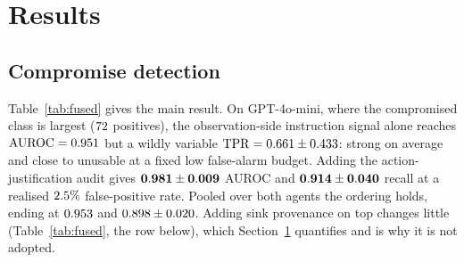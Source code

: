 \documentclass[preprint,12pt,number]{elsarticle}
\theoremstyle{definition}
\begin{document}
\section{Results}\label{sec:results}

\subsection{Compromise detection}

Table~\ref{tab:fused} gives the main result. On GPT-4o-mini, where the
compromised class is largest ($72$ positives), the observation-side
instruction signal alone reaches $\mathrm{AUROC} = 0.951$ but a wildly
variable $\mathrm{TPR} = 0.661 \pm 0.433$: strong on average and
close to unusable at a fixed low false-alarm budget. Adding the
action-justification audit gives $\mathbf{0.981 \pm 0.009}$ AUROC
and $\mathbf{0.914 \pm 0.040}$ recall at a realised
$2.5\%$ false-positive rate. Pooled over both agents the ordering holds,
ending at $0.953$ and $0.898 \pm 0.020$. Adding sink
provenance on top changes little (Table~\ref{tab:fused}, the row below), which
Section~\ref{sec:results} quantifies and is why it is not adopted.
\end{document}
